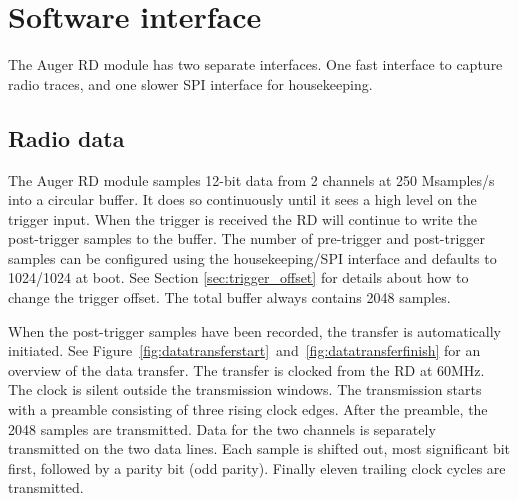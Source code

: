 \documentclass[a4paper,indent]{paper}
\begin{document}
\section{Software interface}
The Auger RD module has two separate interfaces. One fast interface to capture radio traces, and one slower SPI interface for housekeeping. 

\subsection{Radio data}
The Auger RD module samples 12-bit data from 2 channels at 250 Msamples/s into a circular buffer.
It does so continuously until it sees a high level on the trigger input. When the trigger is received the RD will continue to write the post-trigger samples to the buffer.
The number of pre-trigger and post-trigger samples can be configured using the housekeeping/SPI interface and defaults to 1024/1024 at boot.
See Section \ref{sec:trigger_offset} for details about how to change the trigger offset. The total buffer always contains 2048 samples.

When the post-trigger samples have been recorded, the transfer is automatically initiated.
See Figure~\ref{fig:datatransferstart}~and~\ref{fig:datatransferfinish} for an overview of the data transfer. 
The transfer is clocked from the RD at 60MHz. The clock is silent outside the transmission windows.
The transmission starts with a preamble consisting of three rising clock edges.
After the preamble, the 2048 samples are transmitted. Data for the two channels is separately transmitted on the two data lines.
Each sample is shifted out, most significant bit first, followed by a parity bit (odd parity). Finally eleven trailing clock cycles are transmitted.
\end{document}
